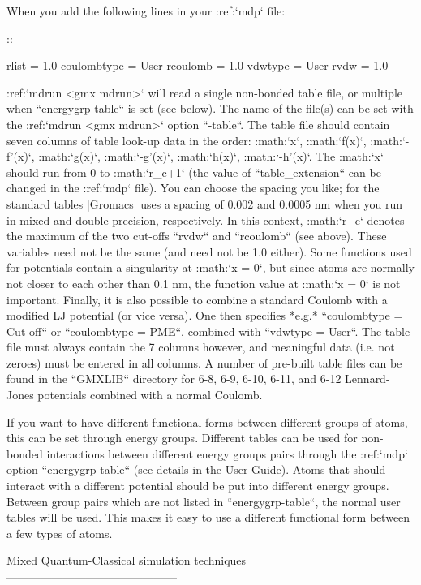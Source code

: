 When you add the following lines in your :ref:`mdp` file:

::

    rlist           = 1.0
    coulombtype     = User
    rcoulomb        = 1.0
    vdwtype         = User
    rvdw            = 1.0

:ref:`mdrun <gmx mdrun>` will read a single non-bonded table file, or
multiple when ``energygrp-table`` is set (see below). The
name of the file(s) can be set with the :ref:`mdrun <gmx mdrun>` option
``-table``. The table file should contain seven columns of
table look-up data in the order: :math:`x`, :math:`f(x)`,
:math:`-f'(x)`, :math:`g(x)`, :math:`-g'(x)`, :math:`h(x)`,
:math:`-h'(x)`. The :math:`x` should run from 0 to :math:`r_c+1` (the
value of ``table_extension`` can be changed in the
:ref:`mdp` file). You can choose the spacing you like; for the
standard tables |Gromacs| uses a spacing of 0.002 and 0.0005 nm when you
run in mixed and double precision, respectively. In this context,
:math:`r_c` denotes the maximum of the two cut-offs ``rvdw``
and ``rcoulomb`` (see above). These variables need not be
the same (and need not be 1.0 either). Some functions used for
potentials contain a singularity at :math:`x = 0`, but since atoms are
normally not closer to each other than 0.1 nm, the function value at
:math:`x = 0` is not important. Finally, it is also possible to combine
a standard Coulomb with a modified LJ potential (or vice versa). One
then specifies *e.g.* ``coulombtype = Cut-off`` or
``coulombtype = PME``, combined with ``vdwtype
= User``. The table file must always contain the 7 columns however, and
meaningful data (i.e. not zeroes) must be entered in all columns. A
number of pre-built table files can be found in the
``GMXLIB`` directory for 6-8, 6-9, 6-10, 6-11, and 6-12
Lennard-Jones potentials combined with a normal Coulomb.

If you want to have different functional forms between different groups
of atoms, this can be set through energy groups. Different tables can be
used for non-bonded interactions between different energy groups pairs
through the :ref:`mdp` option ``energygrp-table``
(see details in the User Guide). Atoms that should interact with a
different potential should be put into different energy groups. Between
group pairs which are not listed in ``energygrp-table``, the
normal user tables will be used. This makes it easy to use a different
functional form between a few types of atoms.

Mixed Quantum-Classical simulation techniques
---------------------------------------------


